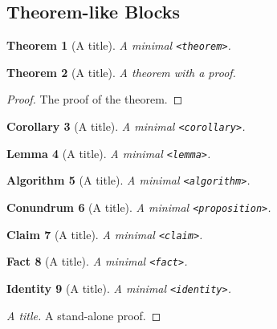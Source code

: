 \documentclass{sn-jnl}
\theoremstyle{thmstyleone}%
\newtheorem{theorem}{Theorem}[section]
\newtheorem{proposition}[theorem]{Conundrum}
\newtheorem{lemma}[theorem]{Lemma}
\newtheorem{corollary}[theorem]{Corollary}
\newtheorem{claim}[theorem]{Claim}
\newtheorem{fact}[theorem]{Fact}
\newtheorem{identity}[theorem]{Identity}
\theoremstyle{thmstyletwo}%
\newtheorem{algorithm}[theorem]{Algorithm}
\theoremstyle{thmstylethree}%
\newcommand{\mono}[1]{\texttt{#1}}
\numberwithin{equation}{section}
\begin{document}
\subsection{Theorem-like Blocks}\label{block-samples-theorem-like}%
\begin{theorem}[A title]\label{block-samples-theorem-like-2}%
%
A minimal \mono{<theorem>}.%
\end{theorem}
\begin{theorem}[A title]\label{block-samples-theorem-like-3}%
%
A theorem with a proof.%
\end{theorem}
\begin{proof}\label{block-samples-theorem-like-3-3}%
The proof of the theorem.%
\end{proof}
\begin{corollary}[A title]\label{block-samples-theorem-like-4}%
%
A minimal \mono{<corollary>}.%
\end{corollary}
\begin{lemma}[A title]\label{block-samples-theorem-like-5}%
%
A minimal \mono{<lemma>}.%
\end{lemma}
\begin{algorithm}[A title]\label{block-samples-theorem-like-6}%
%
A minimal \mono{<algorithm>}.%
\end{algorithm}
\begin{proposition}[A title]\label{block-samples-theorem-like-7}%
%
A minimal \mono{<proposition>}.%
\end{proposition}
\begin{claim}[A title]\label{block-samples-theorem-like-8}%
%
A minimal \mono{<claim>}.%
\end{claim}
\begin{fact}[A title]\label{block-samples-theorem-like-9}%
%
A minimal \mono{<fact>}.%
\end{fact}
\begin{identity}[A title]\label{block-samples-theorem-like-10}%
%
A minimal \mono{<identity>}.%
\end{identity}
\begin{proof}[A title]\label{block-samples-theorem-like-11}%
A stand-alone proof.%
\end{proof}
%
%
\typeout{************************************************}
\typeout{************************************************}
%
\end{document}
